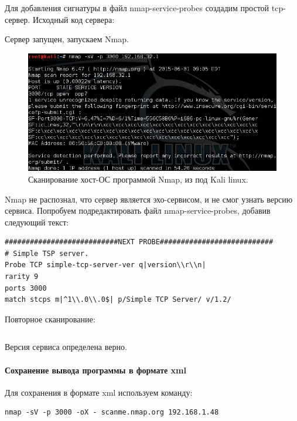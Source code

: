 \documentclass[a4paper, 14pt]{article}				%
\begin{document}
Для добавления сигнатуры в файл nmap-service-probes создадим простой tcp-сервер. Исходный код сервера:


Сервер запущен, запускаем Nmap.
\begin{figure}[h!]
\centering
\includegraphics[width=\textwidth]{rsrc/nmap_2}
\caption{Сканирование хост-ОС программой Nmap, из под Kali linux.}
\end{figure}

Nmap не распознал, что сервер является эхо-сервисом, и не смог узнать версию сервиса. Попробуем подредактировать файл nmap-service-probes, добавив следующий текст:
\begin{Verbatim}[frame=single]
###########################NEXT PROBE###########################
# Simple TSP server.
Probe TCP simple-tcp-server-ver q|version\\r\\n|
rarity 9
ports 3000
match stcps m|^1\\.0\\.0$| p/Simple TCP Server/ v/1.2/
\end{Verbatim}

Повторное сканирование:

\begin{Verbatim}[frame=single]

\end{Verbatim}
Версия сервиса определена верно.

\paragraph{Сохранение вывода программы в формате xml\\}
Для сохранения в формате xml используем команду:
\begin{Verbatim}[frame=single]
nmap -sV -p 3000 -oX - scanme.nmap.org 192.168.1.48
\end{Verbatim}
\end{document}
